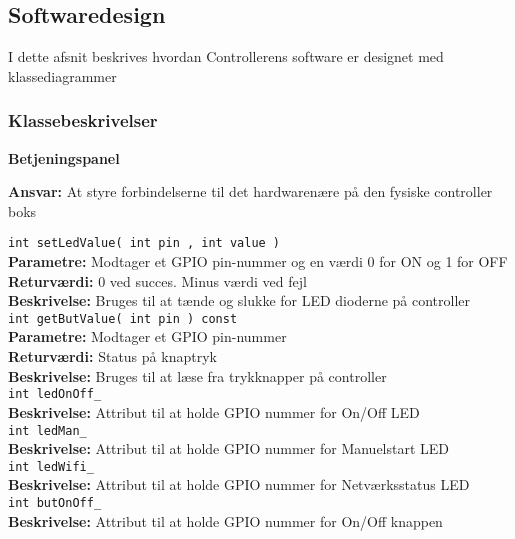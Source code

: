 \subsection{Softwaredesign}

I dette afsnit beskrives hvordan Controllerens software er designet med klassediagrammer

\subsubsection*{Klassebeskrivelser}


{\centering
\textbf{Betjeningspanel}\par
}
\textbf{Ansvar:} At styre forbindelserne til det hardwarenære på den fysiske controller boks \

\verb+int setLedValue( int pin , int value ) +\\
\textbf{Parametre:}   Modtager et GPIO pin-nummer og en værdi 0 for ON og 1 for OFF \\
\textbf{Returværdi:}  0 ved succes. Minus værdi ved fejl \\
\textbf{Beskrivelse:} Bruges til at tænde og slukke for LED dioderne på controller \\

\verb+int getButValue( int pin ) const +\\
\textbf{Parametre:}   Modtager et GPIO pin-nummer \\
\textbf{Returværdi:}  Status på knaptryk \\
\textbf{Beskrivelse:} Bruges til at læse fra trykknapper på controller  \\

\verb+int ledOnOff_ +\\
\textbf{Beskrivelse:} Attribut til at holde GPIO nummer for On/Off LED \\

\verb+int ledMan_ +\\
\textbf{Beskrivelse:} Attribut til at holde GPIO nummer for Manuelstart LED \\

\verb+int ledWifi_ +\\
\textbf{Beskrivelse:} Attribut til at holde GPIO nummer for Netværksstatus LED\\

\verb+int butOnOff_ +\\
\textbf{Beskrivelse:} Attribut til at holde GPIO nummer for On/Off knappen \\

